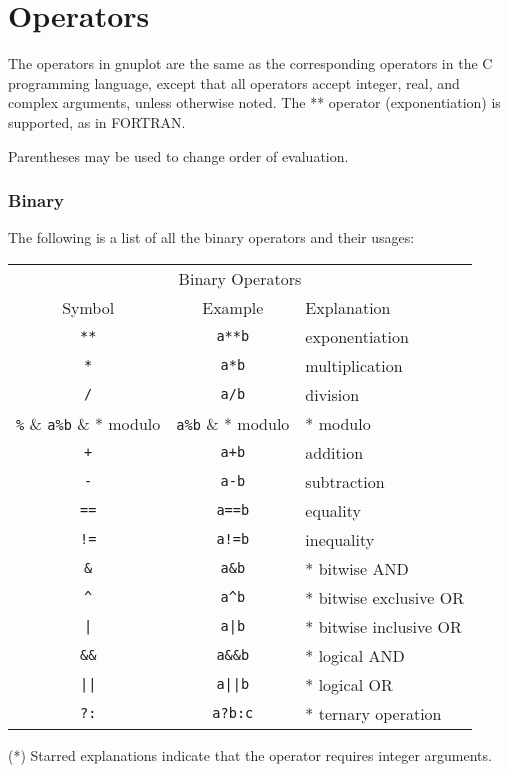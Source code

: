
\section{Operators}
The operators in gnuplot are the same as the corresponding operators
in the C programming language, except that all operators accept
integer, real, and complex arguments, unless otherwise noted.
The ** operator (exponentiation) is supported, as in FORTRAN.

Parentheses may be used to change order of evaluation.



\bye
\subsubsection{Binary}
The following is a list of all the binary operators and their
usages:


\begin{center}
\begin{tabular}{|ccl|} \hline
\multicolumn{3}{|c|}{Binary Operators} \\
Symbol & Example & Explanation \\ \hline
\verb~**~ & \verb~a**b~ & exponentiation\\
\verb~*~ & \verb~a*b~ & multiplication\\
\verb~/~ & \verb~a/b~ & division\\
\verb~%~ & \verb~a%b~ & * modulo\\
\verb~+~ & \verb~a+b~ & addition\\
\verb~-~ & \verb~a-b~ & subtraction\\
\verb~==~ & \verb~a==b~ & equality\\
\verb~!=~ & \verb~a!=b~ & inequality\\
\verb~&~ & \verb~a&b~ & * bitwise AND\\
\verb~^~ & \verb~a^b~ & * bitwise exclusive OR\\
\verb~|~ & \verb~a|b~ & * bitwise inclusive OR\\
\verb~&&~ & \verb~a&&b~ & * logical AND\\
\verb~||~ & \verb~a||b~ & * logical OR\\
\verb~?:~ & \verb~a?b:c~ & * ternary operation\\
\hline
\end{tabular}
\end{center}
(*) Starred explanations indicate that the operator requires
integer arguments.

